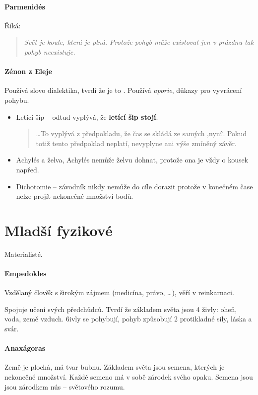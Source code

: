 \documentclass[10pt,a4paper,
twoside,%
]{report}
\begin{document}
\paragraph{Parmenidés} Říká:

\begin{quote}
\emph{Svět je koule, která je plná. Protože pohyb může existovat jen v prázdnu tak pohyb neexistuje.}
\end{quote}

\paragraph{Zénon z Eleje} Používá slovo dialektika, tvrdí že je to . Používá \emph{aporie}, důkazy pro vyvrácení pohybu.
\begin{itemize}
\item Letící šíp -- odtud vyplývá, že \textbf{letící šip stojí}.
\begin{quote}
\dots To vyplývá z předpokladu, že čas se skládá ze samých ‚nyní‘. Pokud totiž tento předpoklad neplatí, nevyplyne ani výše zmíněný závěr.
\end{quote}
\item Achylés a želva, Achylés nemůže želvu dohnat, protože ona je vždy o kousek napřed.

\item Dichotomie -- závodník nikdy nemůže do cíle dorazit protože v konečném čase nelze projít nekonečné množství bodů.
\end{itemize}

\section{Mladší fyzikové}

Materialisté.

\paragraph{Empedokles}

Vzdělaný člověk s širokým zájmem (medicína, právo, \dots), věří v reinkarnaci.

Spojuje učení svých předchůdců. Tvrdí že základem světa jsou 4 živly: oheň, voda, země vzduch. 6ivly se pohybují, pohyb způsobují 2 protikladné síly, láska a svár.

\paragraph{Anaxágoras}
Země je plochá, má tvar bubnu. Základem světa jsou semena, kterých je nekonečné množství. Každé semeno má v sobě  zárodek svého opaku. Semena jsou jsou zárodkem nús -- světového rozumu.
\end{document}
